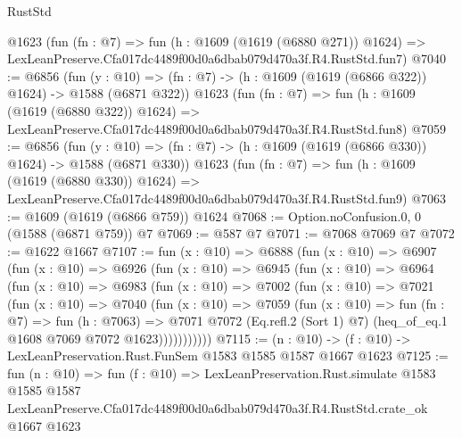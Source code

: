 \begin{lexlean}{RustStd}
\begin{coremodule}
    @1623
    (fun (fn : @7) =>
    fun (h : @1609 (@1619 (@6880 @271)) @1624) =>
    LexLeanPreserve.Cfa017dc4489f00d0a6dbab079d470a3f.R4.RustStd.fun7)
@7040 := @6856
    (fun (y : @10) => (fn : @7) -> (h : @1609 (@1619 (@6866 @322)) @1624) -> @1588 (@6871 @322))
    @1623
    (fun (fn : @7) =>
    fun (h : @1609 (@1619 (@6880 @322)) @1624) =>
    LexLeanPreserve.Cfa017dc4489f00d0a6dbab079d470a3f.R4.RustStd.fun8)
@7059 := @6856
    (fun (y : @10) => (fn : @7) -> (h : @1609 (@1619 (@6866 @330)) @1624) -> @1588 (@6871 @330))
    @1623
    (fun (fn : @7) =>
    fun (h : @1609 (@1619 (@6880 @330)) @1624) =>
    LexLeanPreserve.Cfa017dc4489f00d0a6dbab079d470a3f.R4.RustStd.fun9)
@7063 := @1609 (@1619 (@6866 @759)) @1624
@7068 := Option.noConfusion.{0, 0} (@1588 (@6871 @759)) @7
@7069 := @587 @7
@7071 := @7068 @7069 @7
@7072 := @1622 @1667
@7107 := fun (x : @10) =>
  @6888
    (fun (x : @10) =>
    @6907
      (fun (x : @10) =>
      @6926
        (fun (x : @10) =>
        @6945
          (fun (x : @10) =>
          @6964
            (fun (x : @10) =>
            @6983
              (fun (x : @10) =>
              @7002
                (fun (x : @10) =>
                @7021
                  (fun (x : @10) =>
                  @7040
                    (fun (x : @10) =>
                    @7059
                      (fun (x : @10) =>
                      fun (fn : @7) =>
                      fun (h : @7063) =>
                      @7071
                        @7072
                        (Eq.refl.{2} (Sort 1) @7)
                        (heq_of_eq.{1} @1608 @7069 @7072 @1623)))))))))))
@7115 := (n : @10) -> (f : @10) -> LexLeanPreservation.Rust.FunSem @1583 @1585 @1587 @1667 @1623
@7125 := fun (n : @10) =>
  fun (f : @10) =>
  LexLeanPreservation.Rust.simulate
    @1583
    @1585
    @1587
    LexLeanPreserve.Cfa017dc4489f00d0a6dbab079d470a3f.R4.RustStd.crate_ok
    @1667
    @1623
\end{coremodule}
\end{lexlean}
